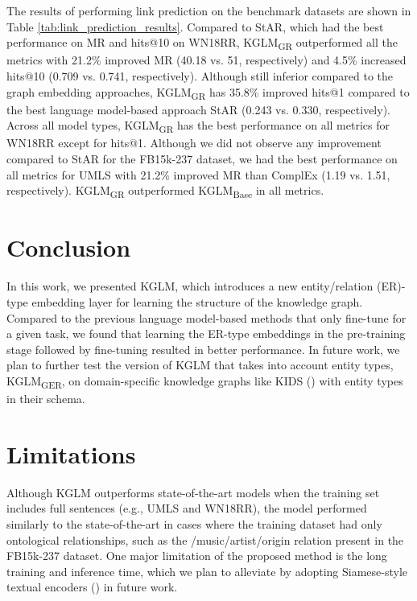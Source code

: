 \documentclass[11pt]{article}
\begin{document}
The results of performing link prediction on the benchmark datasets are shown in Table \ref{tab:link_prediction_results}. Compared to StAR, which had the best performance on MR and hits@10 on WN18RR, KGLM\textsubscript{GR} outperformed all the metrics with 21.2\% improved MR (40.18 vs. 51, respectively) and 4.5\% increased hits@10 (0.709 vs. 0.741, respectively). Although still inferior compared to the graph embedding approaches, KGLM\textsubscript{GR} has 35.8\% improved hits@1 compared to the best language model-based approach StAR (0.243 vs. 0.330, respectively). Across all model types, KGLM\textsubscript{GR} has the best performance on all metrics for WN18RR except for hits@1. Although we did not observe any improvement compared to StAR for the FB15k-237 dataset, we had the best performance on all metrics for UMLS with 21.2\% improved MR than ComplEx (1.19 vs. 1.51, respectively). KGLM\textsubscript{GR} outperformed KGLM\textsubscript{Base} in all metrics.

\section{Conclusion}
In this work, we presented KGLM, which introduces a new entity/relation (ER)-type embedding layer for learning the structure of the knowledge graph. Compared to the previous language model-based methods that only fine-tune for a given task, we found that learning the ER-type embeddings in the pre-training stage followed by fine-tuning resulted in better performance. In future work, we plan to further test the version of KGLM that takes into account entity types,  KGLM\textsubscript{{GER}}, on domain-specific knowledge graphs like KIDS (\citealp{youn2022knowledge}) with entity types in their schema.

\section*{Limitations}
Although KGLM outperforms state-of-the-art models when the training set includes full sentences (e.g., UMLS and WN18RR), the model performed similarly to the state-of-the-art in cases where the training dataset had only ontological relationships, such as the /music/artist/origin relation present in the FB15k-237 dataset. One major limitation of the proposed method is the long training and inference time, which we plan to alleviate by adopting Siamese-style textual encoders (\citealp{wang2021structure, li2022lp}) in future work.
\end{document}
